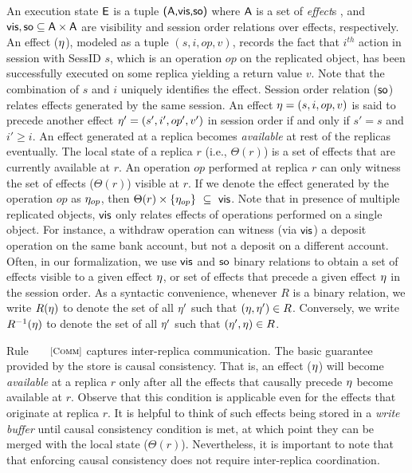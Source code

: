 An execution state ${\normalfont \textsf{E}}$ is a tuple ${\normalfont \textsf{({\normalfont \textsf{A}},\allowbreak {\normalfont \textsf{vis}},\allowbreak {\normalfont \textsf{so}})}}$ where ${\normalfont \textsf{A}}$ is a set
of \emph{effect}s , and ${\normalfont \textsf{vis}},{\normalfont \textsf{so}} \subseteq {\normalfont \textsf{A}} \times
{\normalfont \textsf{A}}$ are visibility and session order relations over effects,
respectively. An effect ($\eta$), modeled as a tuple $(s,i,op,v)$,
records the fact that $i^{th}$ action in session with {\sf SessID}
$s$, which is an operation $op$ on the replicated object, has been
successfully executed on some replica yielding a return value $v$.
Note that the combination of $s$ and $i$ uniquely identifies the
effect. Session order relation (${\normalfont \textsf{so}}$) relates effects generated by
the same session. An effect $\eta = (s,i,op,v)$ is said to precede
another effect $\eta' = (s',i',op',v')$ in session order if and
only if $s'=s$ and $i'\ge i$. An effect generated at a replica becomes
\emph{available} at rest of the replicas eventually. The local state
of a replica $r$ (i.e., $\Theta(r)$) is a set of effects that are
currently available at $r$. An operation $op$ performed at replica $r$
can only witness the set of effects ($\Theta(r)$) visible at $r$. If we denote the
effect generated by the operation $op$ as $\eta_{op}$, then $\Theta(r)
\times \{\eta_{op}\} ~\subseteq~ {\normalfont \textsf{vis}}$. Note that in presence of
multiple replicated objects, ${\normalfont \textsf{vis}}$ only relates effects of
operations performed on a single object. For instance, a {\sf
withdraw} operation can witness (via ${\normalfont \textsf{vis}}$) a {\sf deposit}
operation on the same bank account, but not a {\sf deposit} on a
different account. Often, in our formalization, we use ${\normalfont \textsf{vis}}$ and
${\normalfont \textsf{so}}$ binary relations to obtain a set of effects visible to a given
effect $\eta$, or set of effects that precede a given effect $\eta$ in
the session order. As a syntactic convenience, whenever $R$ is a
binary relation, we write $R(\eta)$ to denote the set of all $\eta'$
such that $(\eta,\eta') \in R$.  Conversely, we write $R^{-1}(\eta)$
to denote the set of all $\eta'$ such that $(\eta',\eta) \in R$.  

Rule $\rulelabel{Comm}$ captures inter-replica communication. The
basic guarantee provided by the store is causal consistency. That is,
an effect ($\eta$) will become \emph{available} at a replica $r$ 
only after all the effects that causally precede $\eta$ become
available at $r$. Observe that this condition is applicable even for
the effects that originate at replica $r$. It is helpful to think of
such effects being stored in a \emph{write buffer} until causal
consistency condition is met, at which point they can be merged with
the local state ($\Theta(r)$). Nevertheless, it is important to note
that that enforcing causal consistency does not require inter-replica
coordination.

